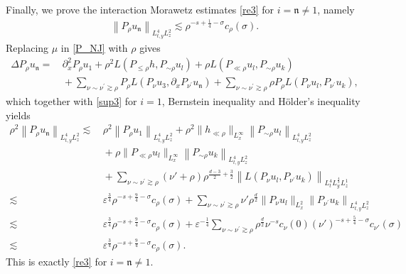 \documentclass[11pt,letterpaper,reqno]{amsart}
\numberwithin{equation}{section}
\theoremstyle{definition}
\theoremstyle{remark}
\begin{document}
Finally, we prove the interaction Morawetz estimates \eqref{re3} for $  i=\mathfrak{n} \neq 1 $, namely
\begin{align*}
	  \left\|  P_\rho u_{\mathfrak{n}}   \right\|_{L^4_{t,y}L^2_{z} }\lesssim \rho^{-s+\frac 14-\sigma} c_\rho(\sigma).
\end{align*}
Replacing $ \mu$ in \eqref{P_NJ} with $ \rho  $   gives
\begin{align}
	 \Delta 	P_{\rho}   u_{\mathfrak{n}}=&  \,  \partial_x^2 P_{\rho}u_1+  \rho^2  L(P_{\leq \rho} h,   P_{\sim \rho} u_{l})+   \rho   L( P_{\ll \rho} u_l, P_{\sim \rho} u_{k}  )  \label{P.math.n}  \\
 &\, + \sum_{\nu \sim \nu^\prime \gtrsim \rho}P_{\rho }    L (  P_\nu u_3,   \partial_x P_{\nu^\prime } 
 u_{\mathfrak{n}})+  \sum_{  \nu \sim \nu^\prime \gtrsim \rho} 
 \rho  P_{\rho} L (P_{\nu} u_l,     P_{\nu^\prime } u_k), \nonumber
\end{align}
which together with \eqref{sup3} for $  i=  1 $, Bernstein  inequality and H\"older's inequality yields
\begin{align*}
    \rho^2 \left\|  P_\rho u_{\mathfrak{n}}   \right\|_{L^4_{t,y}L^2_{z} } \lesssim &\,  \rho^2\left\|  P_\rho u_{1}   \right\|_{L^4_{t,y}L^2_{z} } +    \rho^2 \|   h_{\ll \rho}\|_{L^\infty_x}   \left\|  P_{\sim \rho} u_{l}   \right\|_{L^4_{t,y}L^2_{z} }\\
    &\,+ \rho   \| P_{\ll \rho} u_l\|_{L^\infty_x}   \left\|  P_{\sim \rho} u_{k}   \right\|_{L^4_{t,y}L^2_{z} }\\
    &\,+  \sum_{  \nu \sim \nu^\prime \gtrsim \rho} 
 (\nu'+\rho) \rho^{\frac{d-3}2 +\frac{3}2 } \left\|     L (P_{\nu} u_l,     P_{\nu^\prime } u_k)   \right\|_{L^4_{t}L^{\frac 43}_y L^1_{z} }\\
 \lesssim &\, \varepsilon^{\frac{3}{4}} \rho^{-s+\frac 94-\sigma} c_\rho (\sigma) +\sum_{  \nu \sim \nu^\prime \gtrsim \rho} 
 \nu' \rho^{\frac{d}2  }  \| P_{  \nu} u_l\|_{L^2_x}   \left\|  P_{\nu^\prime} u_{k}   \right\|_{L^4_{t,y}L^2_{z} }\\
  \lesssim &\, \varepsilon^{\frac{3}{4}} \rho^{-s+\frac 94-\sigma} c_\rho (\sigma) +\varepsilon^{-\frac 14} \sum_{   \nu \sim \nu^\prime \gtrsim \rho} 
   \rho^{\frac{d}2  } \nu^{-s} c_\nu (0)  (\nu')^{-s+\frac 54-\sigma} c_{\nu'} (\sigma) \\
    \lesssim &\, \varepsilon^{\frac{3}{4}} \rho^{-s+\frac 94-\sigma} c_\rho (\sigma) .
\end{align*}
This is exactly \eqref{re3} for $ i= \mathfrak{n} \neq 1 $.
\end{document}
